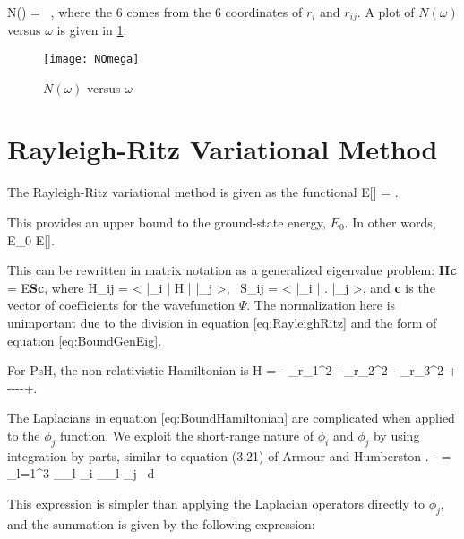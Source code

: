 \documentclass[Dissertation.tex]{subfiles}
\begin{document}
\beq
\label{eq:NumberTermsOmega}
N(\omega) =  \, ,
\eeq
\noindent where the 6 comes from the 6 coordinates of $r_i$ and $r_{ij}$.  A plot of $N(\omega)$ versus $\omega$ is given in \cref{fig:NOmega}.

\begin{figure}[H]
	\centering
	\texttt{[image: NOmega]}
	\caption{$N(\omega)$ versus $\omega$}
	\label{fig:NOmega}
\end{figure}


\section{Rayleigh-Ritz Variational Method}
The Rayleigh-Ritz variational method is given as the functional
\beq
\label{eq:RayleighRitz}
E[\Psi] = .
\eeq

\noindent This provides an upper bound to the ground-state energy, $E_0$.  In other words,
\beq
E_0 \leq E[\Psi].
\eeq

This can be rewritten in matrix notation as a generalized eigenvalue problem: \cite{}
\beq
\label{eq:BoundGenEig}
\textbf{Hc} = E\textbf{Sc},
\eeq
where
\beq
\label{eq:HijSij}
H_{ij} = \left< \bar{\phi}_i \left| H \right| \bar{\phi}_j \right>\!, \, S_{ij} = \left< \bar{\phi}_i \left| \right.\! \bar{\phi}_j \right>, 
\eeq
and \textbf{c} is the vector of coefficients for the wavefunction $\Psi$.  The normalization here is unimportant due to the division in equation \ref{eq:RayleighRitz} and the form of equation \ref{eq:BoundGenEig}.

For PsH, the non-relativistic Hamiltonian is
\beq
\label{eq:BoundHamiltonian}
H = - \nabla_{r_1}^2 -  \nabla_{r_2}^2 -  \nabla_{r_3}^2 + ----+.
\eeq

The Laplacians in equation \ref{eq:BoundHamiltonian} are complicated when applied to the $\phi_j$ function.  We exploit the short-range nature of $\phi_i$ and $\phi_j$ by using integration by parts, similar to equation (3.21) of Armour and Humberston \cite{Armour1991}.
\beq
\label{eq:BoundGradient}
- = \int \sum_{l=1}^3 \boldsymbol{\nabla}_{\!_l} \phi_i \boldsymbol{\cdot} \boldsymbol{\nabla}_{\!_l} \phi_j \, d\tau
\eeq

\noindent This expression is simpler than applying the Laplacian operators directly to $\phi_j$, and the summation is given by the following expression:
\end{document}
